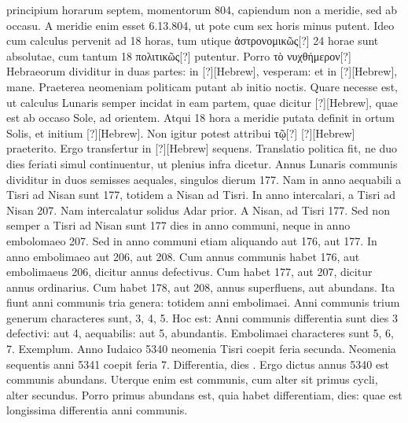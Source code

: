 principium horarum septem, momentorum 804, capiendum
non a meridie, sed ab occasu.
A meridie enim esset 6.13.804,
ut pote cum sex horis minus putent.
Ideo cum calculus pervenit ad
18 horas, tum utique \textgreek{ἀστρονομικῶς[?]} 24 horae sunt absolutae,
 cum tantum
18 \textgreek{πολιτικῶς[?]} putentur.
Porro \textgreek{τὸ νυχθήμερον[?]} Hebraeorum dividitur
in duas partes: in \texthebrew{[?]}[Hebrew], vesperam:
 et in \texthebrew{[?]}[Hebrew], mane.
Praeterea
neomeniam politicam putant ab initio noctis.
Quare necesse
est, ut calculus Lunaris semper incidat in eam partem, quae dicitur
\texthebrew{[?]}[Hebrew], quae est ab occaso Sole, ad orientem.
Atqui 18 hora a meridie
putata definit in ortum Solis, et initium \texthebrew{[?]}[Hebrew].
Non igitur potest attribui
\textgreek{τῷ[?]} \texthebrew{[?]}[Hebrew] praeterito.
Ergo transfertur in \texthebrew{[?]}[Hebrew] sequens.
Translatio
politica fit, ne duo dies feriati simul continuentur, ut plenius
infra dicetur.
Annus Lunaris communis dividitur in duos semisses
aequales, singulos dierum 177.
Nam in anno aequabili a Tisri
ad Nisan sunt 177, totidem a Nisan ad Tisri.
In anno intercalari, a
Tisri ad Nisan 207.
Nam intercalatur solidus Adar prior.
A Nisan,
ad Tisri 177.
Sed non semper a Tisri ad Nisan sunt 177 dies in anno
communi, neque in anno embolomaeo 207.
Sed in anno communi
etiam aliquando aut 176, aut 177.
In anno embolimaeo aut 206, aut
208.
Cum annus communis habet 176, aut embolimaeus 206, dicitur
annus defectivus.
Cum habet 177, aut 207, dicitur annus ordinarius.
Cum habet 178, aut 208, annus superfluens, aut abundans.
Ita fiunt
anni communis tria genera: totidem anni embolimaei.
Anni communis
trium generum characteres sunt, 3, 4, 5.
Hoc est: Anni communis
differentia sunt dies 3 defectivi: aut 4, aequabilis: aut 5, abundantis.
Embolimaei characteres sunt 5, 6, 7.
Exemplum. %
Anno Iudaico 5340
neomenia Tisri coepit feria secunda.
Neomenia sequentis anni 5341
coepit feria 7.
Differentia, dies .
Ergo dictus annus 5340 est communis
abundans.
Uterque enim est communis, cum alter sit primus
cycli, alter secundus.
Porro primus abundans est, quia habet differentiam,
 dies: quae est longissima differentia anni communis.
